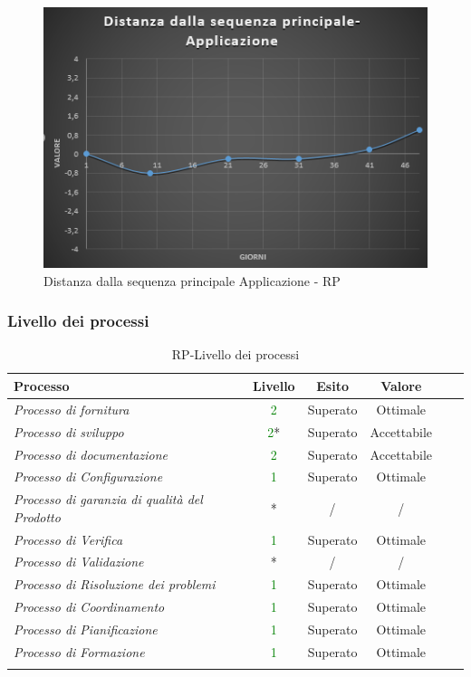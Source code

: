 \begin{figure}[H]
	\centering 
	\includegraphics[scale=0.6]{Sezioni/Immagini/DistanzaApp-RP}
	\caption{Distanza dalla sequenza principale Applicazione - RP}
\end{figure}

\subsubsection{Livello dei processi}
\begin{longtable}{|>{\centering}m{6cm}|c|c|c|c|c|}
\hline
\textbf{Processo} & \textbf{Livello} & \textbf{Esito} & \textbf{Valore}\\
\hline
\endhead
\emph{Processo di fornitura} & \textcolor{Green}{2} & Superato & Ottimale\\ \hline
\emph{Processo di sviluppo} & \textcolor{Green}{2}* & Superato & Accettabile\\ \hline
\emph{Processo di documentazione} & \textcolor{Green}{2} & Superato & Accettabile\\ 
\hline
\emph{Processo di Configurazione} & \textcolor{Green}{1} & Superato & Ottimale\\ 
\hline
\emph{Processo di garanzia di qualità del Prodotto} & * & / & /\\ 
\hline
\emph{Processo di Verifica} & \textcolor{Green}{1} & Superato & Ottimale\\ 
\hline
\emph{Processo di Validazione} & * & / & /\\ 
\hline
\emph{Processo di Risoluzione dei problemi} & \textcolor{Green}{1} & Superato & Ottimale\\ 
\hline
\emph{Processo di Coordinamento} & \textcolor{Green}{1} & Superato & Ottimale\\ 
\hline
\emph{Processo di Pianificazione} & \textcolor{Green}{1} & Superato & Ottimale\\ 
\hline
\emph{Processo di Formazione} & \textcolor{Green}{1} & Superato & Ottimale\\ 
\hline
\caption{RP-Livello dei processi}
\end{longtable}


